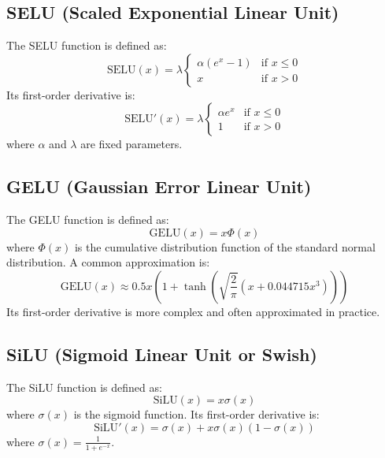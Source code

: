 \documentclass{article}
\begin{document}
\subsection{SELU (Scaled Exponential Linear Unit)}
The SELU function is defined as:
\begin{equation}
\text{SELU}(x) = \lambda 
\begin{cases} 
\alpha (e^x - 1) & \text{if } x \leq 0 \\
x & \text{if } x > 0 
\end{cases}
\end{equation}
Its first-order derivative is:
\begin{equation}
\text{SELU}'(x) = \lambda
\begin{cases} 
\alpha e^x & \text{if } x \leq 0 \\
1 & \text{if } x > 0 
\end{cases}
\end{equation}
where \( \alpha \) and \( \lambda \) are fixed parameters.

\subsection{GELU (Gaussian Error Linear Unit)}
The GELU function is defined as:
\begin{equation}
\text{GELU}(x) = x \Phi(x)
\end{equation}
where \( \Phi(x) \) is the cumulative distribution function of the standard normal distribution. A common approximation is:
\begin{equation}
\text{GELU}(x) \approx 0.5 x \left(1 + \tanh\left(\sqrt{\frac{2}{\pi}} (x + 0.044715 x^3)\right)\right)
\end{equation}
Its first-order derivative is more complex and often approximated in practice.

\subsection{SiLU (Sigmoid Linear Unit or Swish)}
The SiLU function is defined as:
\begin{equation}
\text{SiLU}(x) = x \sigma(x)
\end{equation}
where \( \sigma(x) \) is the sigmoid function. Its first-order derivative is:
\begin{equation}
\text{SiLU}'(x) = \sigma(x) + x \sigma(x) (1 - \sigma(x))
\end{equation}
where \( \sigma(x) = \frac{1}{1 + e^{-x}} \).
\end{document}
